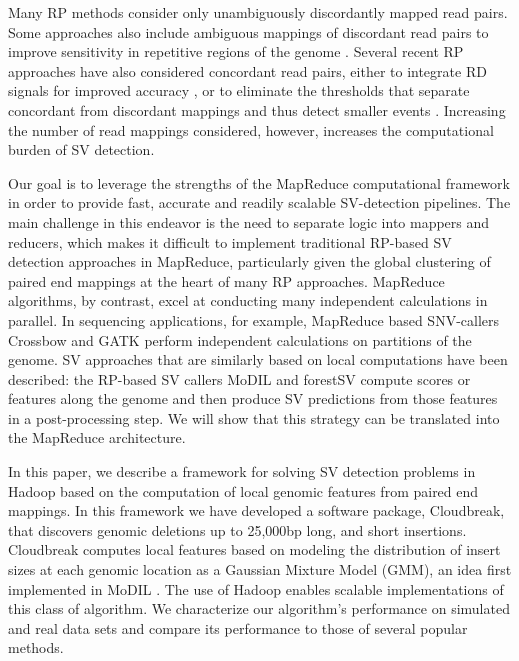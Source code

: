 \documentclass[10pt]{bmc_article}
\newenvironment{bmcformat}{\fussy\setboolean{publ}{true}}{\fussy}
\begin{document}
\begin{bmcformat}
Many RP methods consider only unambiguously discordantly mapped read pairs. Some approaches also include ambiguous mappings of discordant read pairs to improve sensitivity in repetitive regions of the genome \cite{Hormozdiari:2009p284,Quinlan:2010gf}. Several recent RP approaches have also considered concordant read pairs, either to integrate RD signals for improved accuracy \cite{Sindi:2012kk,Michaelson:2012fj,Chiara:2012ey}, or to eliminate the thresholds that separate concordant from discordant mappings and thus detect smaller events \cite{Marschall:2012ek}. Increasing the number of read mappings considered, however, increases the computational burden of SV detection. 

Our goal is to leverage the strengths of the MapReduce computational framework in order to provide fast, accurate and readily scalable SV-detection pipelines. The main challenge in this endeavor is the need to separate logic into mappers and reducers, which makes it difficult to implement traditional RP-based SV detection approaches in MapReduce, particularly given the global clustering of paired end mappings at the heart of many RP approaches. MapReduce algorithms, by contrast, excel at conducting many independent calculations in parallel. In sequencing applications, for example, MapReduce based SNV-callers Crossbow \cite{Langmead:2009p1225} and GATK \cite{McKenna:2010p1051} perform independent calculations on partitions of the genome. SV approaches that are similarly based on local computations have been described: the RP-based SV callers MoDIL \cite{Lee:2009da} and forestSV \cite{Michaelson:2012fj} compute scores or features along the genome and then produce SV predictions from those features in a post-processing step. We will show that this strategy can be translated into the MapReduce architecture.

In this paper, we describe a framework for solving SV detection problems in Hadoop based on the computation of local genomic features from paired end mappings. In this framework we have developed a software package, Cloudbreak, that discovers genomic deletions up to 25,000bp long, and short insertions. Cloudbreak computes local features based on modeling the distribution of insert sizes at each genomic location as a Gaussian Mixture Model (GMM), an idea first implemented in MoDIL \cite{Lee:2009da}. The use of Hadoop enables scalable implementations of this class of algorithm. We characterize our algorithm's performance on simulated and real data sets and compare its performance to those of several popular methods. 


\end{bmcformat}
\end{document}
